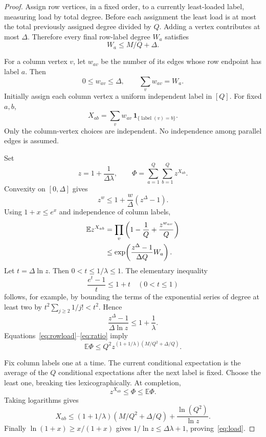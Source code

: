 \documentclass[11pt,letterpaper]{article}
\numberwithin{equation}{section}
\theoremstyle{definition}\newtheorem{definition}[theorem]{Definition}
\theoremstyle{remark}\newtheorem{remark}[theorem]{Remark}
\begin{document}
\begin{proof}
Assign row vertices, in a fixed order, to a currently least-loaded label, measuring load by total degree. Before each assignment the least load is at most the total previously assigned degree divided by $Q$. Adding a vertex contributes at most $\Delta$. Therefore every final row-label degree $W_a$ satisfies
\begin{equation}\label{eq:rowload}
 W_a\le M/Q+\Delta.
\end{equation}

For a column vertex $v$, let $w_{av}$ be the number of its edges whose row endpoint has label $a$. Then
\[
 0\le w_{av}\le\Delta,\qquad \sum_v w_{av}=W_a.
\]
Initially assign each column vertex a uniform independent label in $[Q]$. For fixed $a,b$,
\[
 X_{ab}=\sum_v w_{av}\,\mathbf1_{\{\operatorname{label}(v)=b\}}.
\]
Only the column-vertex choices are independent. No independence among parallel edges is assumed.

Set
\begin{equation}\label{eq:potential}
 z=1+\frac1{\Delta\lambda},\qquad
 \Phi=\sum_{a=1}^Q\sum_{b=1}^Q z^{X_{ab}}.
\end{equation}
Convexity on $[0,\Delta]$ gives
\[
 z^w\le1+\frac{w}{\Delta}(z^\Delta-1).
\]
Using $1+x\le e^x$ and independence of column labels,
\begin{align}
 \mathbb E z^{X_{ab}}
 &=\prod_v\left(1-\frac1Q+\frac{z^{w_{av}}}{Q}\right)\notag\\
 &\le\exp\!\left(\frac{z^\Delta-1}{\Delta Q}W_a\right).
 \label{eq:mgf}
\end{align}
Let $t=\Delta\ln z$. Then $0<t\le1/\lambda\le1$. The elementary inequality
\[
 \frac{e^t-1}{t}\le1+t\quad(0<t\le1)
\]
follows, for example, by bounding the terms of the exponential series of degree at least two by $t^2\sum_{j\ge2}1/j!<t^2$. Hence
\begin{equation}\label{eq:ratio}
 \frac{z^\Delta-1}{\Delta\ln z}\le1+\frac1\lambda.
\end{equation}
Equations~\eqref{eq:rowload}--\eqref{eq:ratio} imply
\[
 \mathbb E\Phi\le
 Q^2z^{(1+1/\lambda)(M/Q^2+\Delta/Q)}.
\]

Fix column labels one at a time. The current conditional expectation is the average of the $Q$ conditional expectations after the next label is fixed. Choose the least one, breaking ties lexicographically. At completion,
\[
 z^{X_{ab}}\le\Phi\le\mathbb E\Phi.
\]
Taking logarithms gives
\[
 X_{ab}\le(1+1/\lambda)(M/Q^2+\Delta/Q)
                 +\frac{\ln(Q^2)}{\ln z}.
\]
Finally $\ln(1+x)\ge x/(1+x)$ gives $1/\ln z\le\Delta\lambda+1$, proving~\eqref{eq:load}.


\end{proof}
\end{document}

